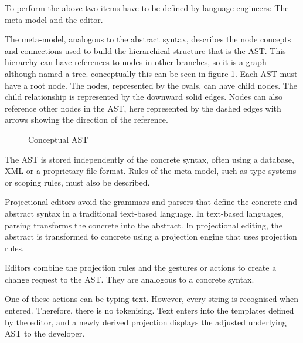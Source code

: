 To perform the above two items have to be defined by language engineers: The meta-model and the editor.

The meta-model, analogous to the abstract syntax, describes the node concepts and connections used to build the hierarchical structure that is the AST.
This hierarchy can have references to nodes in other branches, so it is a graph although named a tree. 
conceptually this can be seen in figure \ref{fig:ast}.
Each AST must have a root node. 
The nodes, represented by the ovals, can have child nodes.
The child relationship is represented by the downward solid edges.
Nodes can also reference other nodes in the AST, here represented by the dashed edges with arrows showing the direction of the reference.

\begin{figure}
    \centering
    \caption{Conceptual AST}
    \label{fig:ast}
\end{figure}

The AST is stored independently of the concrete syntax, often using a database, XML or a proprietary file format.
Rules of the meta-model, such as type systems or scoping rules, must also be described.

Projectional editors avoid the grammars and parsers that define the concrete and abstract syntax in a traditional text-based language.
In text-based languages, parsing transforms the concrete into the abstract.
In projectional editing, the abstract is transformed to concrete using a projection engine that uses projection rules.

Editors combine the projection rules and the gestures or actions to create a change request to the AST.
They are analogous to a concrete syntax.

One of these actions can be typing text. 
However, every string is recognised when entered.
Therefore, there is no tokenising.
Text enters into the templates defined by the editor, and a newly derived projection displays the adjusted underlying AST to the developer.

